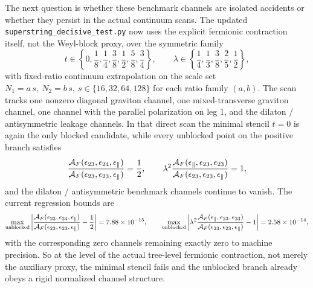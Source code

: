 \documentclass[11pt]{article}
\numberwithin{equation}{section}
\begin{document}
The next question is whether these benchmark channels are isolated accidents or
whether they persist in the actual continuum scans. The updated
\texttt{superstring\_decisive\_test.py} now uses the explicit fermionic
contraction itself, not the Weyl-block proxy, over the symmetric family
\begin{equation}
\label{eq:s15-1-038e}
t\in\left\{0,\frac18,\frac14,\frac38,\frac12,\frac58,\frac34\right\},
\qquad
\lambda\in\left\{\frac14,\frac13,\frac38,\frac25,\frac12\right\},
\end{equation}
with fixed-ratio continuum extrapolation on the scale set
\(
N_1=a\,s,\ N_2=b\,s,\ s\in\{16,32,64,128\}
\)
for each ratio family $(a,b)$. The scan tracks one nonzero diagonal graviton channel, one mixed-transverse graviton channel, one channel with the parallel polarization on leg 1, and the dilaton / antisymmetric leakage channels. In that direct scan the
minimal stencil $t=0$ is again the only blocked candidate, while every
unblocked point on the positive branch satisfies
\begin{equation}
\label{eq:s15-1-038f}
\frac{{\cal A}_F(\epsilon_{23},\epsilon_{24},\epsilon_\parallel)}
{{\cal A}_F(\epsilon_{23},\epsilon_{23},\epsilon_\parallel)}
=
\frac12,
\qquad
\lambda^2
\frac{{\cal A}_F(\epsilon_\parallel,\epsilon_{23},\epsilon_{23})}
{{\cal A}_F(\epsilon_{23},\epsilon_{23},\epsilon_\parallel)}
=
1,
\end{equation}
and the dilaton / antisymmetric benchmark channels continue to vanish. The
current regression bounds are
\begin{equation}
\label{eq:s15-1-038g}
\max_{\rm unblocked}
\left|
\frac{{\cal A}_F(\epsilon_{23},\epsilon_{24},\epsilon_\parallel)}
{{\cal A}_F(\epsilon_{23},\epsilon_{23},\epsilon_\parallel)}
-\frac12
\right|
=7.88\times 10^{-15},
\qquad
\max_{\rm unblocked}
\left|
\lambda^2
\frac{{\cal A}_F(\epsilon_\parallel,\epsilon_{23},\epsilon_{23})}
{{\cal A}_F(\epsilon_{23},\epsilon_{23},\epsilon_\parallel)}
-1
\right|
=2.58\times 10^{-14},
\end{equation}
with the corresponding zero channels remaining exactly zero to machine
precision. So at the level of the actual tree-level fermionic contraction, not
merely the auxiliary proxy, the minimal stencil fails and the unblocked branch
already obeys a rigid normalized channel structure.
\end{document}
